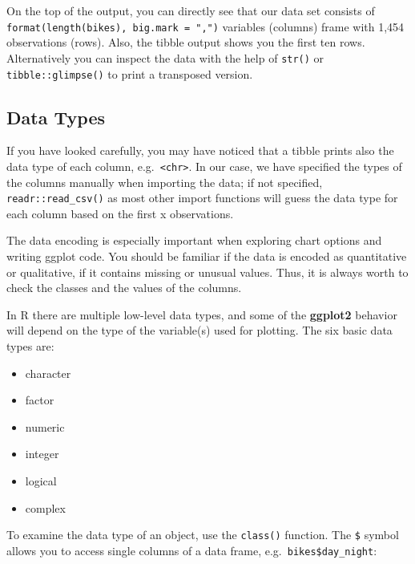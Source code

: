 \documentclass[
]{krantz}
\providecommand{\tightlist}{%
  \setlength{\itemsep}{0pt}\setlength{\parskip}{0pt}}
\begin{document}
On the top of the output, you can directly see that our data set consists of \texttt{format(length(bikes),\ big.mark\ =\ ",")} variables (columns) frame with 1,454 observations (rows). Also, the tibble output shows you the first ten rows. Alternatively you can inspect the data with the help of \texttt{str()} or \texttt{tibble::glimpse()} to print a transposed version.

\hypertarget{classes}{%
\subsection{Data Types}\label{classes}}

If you have looked carefully, you may have noticed that a tibble prints also the data type of each column, e.g.~\texttt{\textless{}chr\textgreater{}}. In our case, we have specified the types of the columns manually when importing the data; if not specified, \texttt{readr::read\_csv()} as most other import functions will guess the data type for each column based on the first x observations.

The data encoding is especially important when exploring chart options and writing ggplot code. You should be familiar if the data is encoded as quantitative or qualitative, if it contains missing or unusual values. Thus, it is always worth to check the classes and the values of the columns.

In R there are multiple low-level data types, and some of the \textbf{ggplot2} behavior will depend on the type of the variable(s) used for plotting. The six basic data types are:

\begin{itemize}
\tightlist
\item
  character
\item
  factor
\item
  numeric
\item
  integer
\item
  logical
\item
  complex
\end{itemize}

To examine the data type of an object, use the \texttt{class()} function. The \texttt{\$} symbol allows you to access single columns of a data frame, e.g.~\texttt{bikes\$day\_night}:
\end{document}
